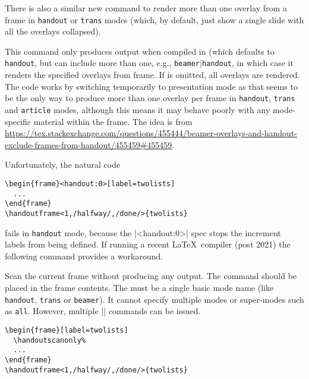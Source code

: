 \documentclass[a4paper]{ltxdoc}
\begin{document}
There is also a similar new command to render more than one overlay from a frame
in \texttt{handout} or \texttt{trans} modes (which, by default, just show a
single slide with all the overlays collapsed).

\begin{command}{\handoutframe{}}
  This command only produces output when compiled in  (which
  defaults to \texttt{handout}, but can include more than one, e.g.,
  \texttt{beamer$\mid$handout}, in which case it renders the specified overlays from frame.
  If  is omitted, all overlays are rendered.  The
  code works by switching temporarily to presentation mode as that seems to be
  the only way to produce more than one overlay per frame in \texttt{handout},
  \texttt{trans} and \texttt{article} modes, although this means it may behave
  poorly with any mode-specific material within the frame.  The idea is from
  \url{https://tex.stackexchange.com/questions/455444/beamer-overlays-and-handout-exclude-frames-from-handout/455459#455459}.
\end{command}

Unfortunately,  the natural code
  \example
\begin{verbatim}
\begin{frame}<handout:0>[label=twolists]
  ...
\end{frame}
\handoutframe<1,/halfway/,/done/>{twolists}
\end{verbatim}
fails in \texttt{handout} mode, because the |<handout:0>| spec stops the
increment labels from being defined.  If running a recent \LaTeX\ compiler (post
2021) the following command provides a workaround.
\begin{command}{\handoutscanonly{}}
  Scan the current frame without producing any output.  The command should be
  placed in the frame contents.  The  must be a single basic mode
  name (like \texttt{handout}, \texttt{trans} or \texttt{beamer}).  It cannot
  specify multiple modes or super-modes such as \texttt{all}. However, multiple
  |\handoutscanonly| commands can be issued.
\example
\begin{verbatim}
\begin{frame}[label=twolists]
  \handoutscanonly%
  ...
\end{frame}
\handoutframe<1,/halfway/,/done/>{twolists}
\end{verbatim}
\end{command}
\end{document}
